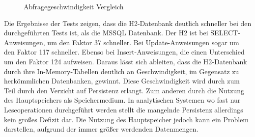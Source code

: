 \begin{figure}[htbp]
\centering
{}\hfill
{}\hfill
{}
\caption{Abfragegeschwindigkeit Vergleich}
\label{ergebniss_vergleich}
\end{figure}

Die Ergebnisse der Tests zeigen, dass die H2-Datenbank deutlich schneller bei den durchgeführten Tests ist, als die MSSQL Datenbank. Der H2 ist bei SELECT-Anweisungen, um den Faktor 37 schneller. Bei Update-Anweisungen sogar um den Faktor 117 schneller. Ebenso bei Insert-Anweisungen, die einen Unterschied um den Faktor 124 aufweisen. Daraus lässt sich ableiten, dass die H2-Datenbank durch ihre In-Memory-Tabellen deutlich an Geschwindigkeit, im Gegensatz zu herkömmlichen Datenbanken, gewinnt. Diese Geschwindigkeit wird durch zum Teil durch den Verzicht auf Persistenz erlangt. Zum anderen durch die Nutzung des Hauptspeichers als Speichermedium. In analytischen Systemen wo fast nur Leseoperationen durchgeführt werden stellt die mangelnde Persistenz allerdings kein großes Defizit dar. Die Nutzung des Hauptspeicher jedoch kann ein Problem darstellen, aufgrund der immer größer werdenden Datenmengen.  

